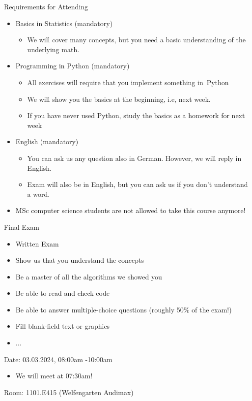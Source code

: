 \documentclass[aspectratio=169,handout]{../latex_main/tntbeamer}  %
\begin{document}
\begin{frame}[c]{Requirements for Attending}

\begin{itemize}
    \item Basics in \alert{Statistics} (mandatory)
    \begin{itemize}
        \item We will cover many concepts, but you need a basic understanding of the underlying math.
    \end{itemize}
  \item Programming in \alert{Python} (mandatory)
  \begin{itemize}
    \item All exercises will require that you implement something in~Python 
    \item We will show you the basics at the beginning, i.e, next week.
    \item If you have never used Python, study the basics as a homework for next week
  \end{itemize}
  \item \alert{English} (mandatory)
    \begin{itemize}
    \item You can ask us any question also in German. However, we will reply in English.
    \item Exam will also be in English, but you can ask us if you don't understand a word.
  \end{itemize}
    \pause
    \break
  \item \alert{MSc computer science students are not allowed to take this course anymore!}
\end{itemize}

\end{frame}
\begin{frame}[c]{Final Exam}

\begin{itemize}
  \item Written Exam
  \item Show us that you understand the concepts
  \item Be a master of all the algorithms we showed you
  \item Be able to read and check code
  \item Be able to answer multiple-choice questions (roughly 50\% of the exam!)
  \item Fill blank-field text or graphics
  \item ...
\end{itemize}

\vspace{1em}
\alert{Date:} 03.03.2024, 08:00am -10:00am\\
    \begin{itemize}
        \item We will meet at 07:30am!
    \end{itemize}
\alert{Room:} 1101.E415 (Welfengarten Audimax)

\end{frame}
\end{document}

